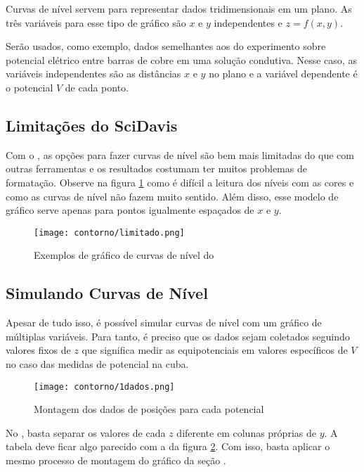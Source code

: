 Curvas de nível servem para representar dados tridimensionais em um plano. As três variáveis para esse tipo de gráfico são $x$ e $y$ independentes e $z = f(x,y)$.

Serão usados, como exemplo, dados semelhantes aos do experimento sobre potencial elétrico entre barras de cobre em uma solução condutiva. Nesse caso, as variáveis independentes são as distâncias $x$ e $y$ no plano e a variável dependente é o potencial $V$ de cada ponto.


\subsection{Limitações do SciDavis}

    Com o \software, as opções para fazer curvas de nível são bem mais limitadas do que com outras ferramentas e os resultados costumam ter muitos problemas de formatação. Observe na figura \ref{fig:contorno:limitado} como é difícil a leitura dos níveis com as cores e como as curvas de nível não fazem muito sentido. Além disso, esse modelo de gráfico serve apenas para pontos igualmente espaçados de $x$ e $y$.

    \begin{figure}[htbp]
        \centering
        \texttt{[image: contorno/limitado.png]}

        \caption{Exemplos de gráfico de curvas de nível do \software}
        \label{fig:contorno:limitado}
    \end{figure}


\subsection{Simulando Curvas de Nível}

    Apesar de tudo isso, é possível simular curvas de nível com um gráfico de múltiplas variáveis. Para tanto, é preciso que os dados sejam coletados seguindo valores fixos de $z$ que significa medir as equipotenciais em valores específicos de $V$ no caso das medidas de potencial na cuba.

    \begin{figure}[htbp]
        \centering
        \texttt{[image: contorno/1dados.png]}

        \caption{Montagem dos dados de posições para cada potencial}
        \label{fig:contorno:dados}
    \end{figure}

    No \software, basta separar os valores de cada $z$ diferente em colunas próprias de $y$. A tabela deve ficar algo parecido com a da figura \ref{fig:contorno:dados}. Com isso, basta aplicar o mesmo processo de montagem do gráfico da seção .


